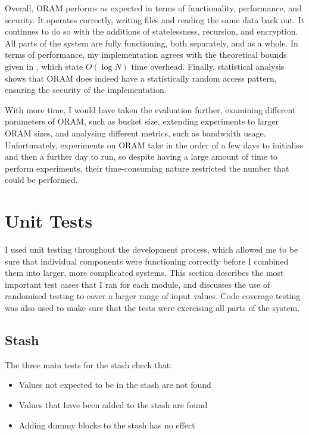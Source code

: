\documentclass[12pt,a4paper,twoside,openright]{report}
\begin{document}
Overall, ORAM performs as expected in terms of functionality, performance, and security. It operates correctly, writing files and reading the same data back out. It continues to do so with the additions of statelessness, recursion, and encryption. All parts of the system are fully functioning, both separately, and as a whole. In terms of performance, my implementation agrees with the theoretical bounds given in \citet{stefanov2013path}, which state $O(\log N)$ time overhead. Finally, statistical analysis shows that ORAM does indeed have a statistically random access pattern, ensuring the security of the implementation.

With more time, I would have taken the evaluation further, examining different parameters of ORAM, such as bucket size, extending experiments to larger ORAM sizes, and analysing different metrics, such as bandwidth usage. Unfortunately, experiments on ORAM take in the order of a few days to initialise and then a further day to run, so despite having a large amount of time to perform experiments, their time-consuming nature restricted the number that could be performed.

\section{Unit Tests}
\label{sec:unitTests}

I used unit testing throughout the development process, which allowed me to be sure that individual components were functioning correctly before I combined them into larger, more complicated systems. This section describes the most important test cases that I ran for each module, and discusses the use of randomised testing to cover a larger range of input values. Code coverage testing was also used to make sure that the tests were exercising all parts of the system.

\subsection{Stash}

The three main tests for the stash check that:

\begin{itemize}
  \item Values not expected to be in the stash are not found
  \item Values that have been added to the stash are found
  \item Adding dummy blocks to the stash has no effect
\end{itemize}
\end{document}
